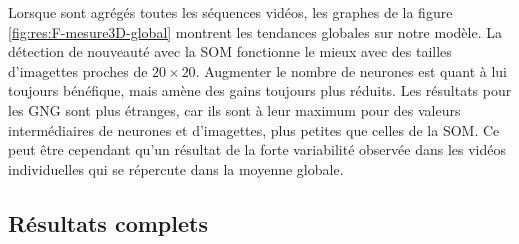 	Lorsque sont agrégés toutes les séquences vidéos, les graphes de la figure \ref{fig:res:F-mesure3D-global} montrent les tendances globales sur notre modèle. La détection de nouveauté avec la SOM fonctionne le mieux avec des tailles d'imagettes proches de $20\times20$. Augmenter le nombre de neurones est quant à lui toujours bénéfique, mais amène des gains toujours plus réduits. Les résultats pour les GNG sont plus étranges, car ils sont à leur maximum pour des valeurs intermédiaires de neurones et d'imagettes, plus petites que celles de la SOM. Ce peut être cependant qu'un résultat de la forte variabilité observée dans les vidéos individuelles qui se répercute dans la moyenne globale.

	\subsection{Résultats complets}\label{sec:res:stats}

